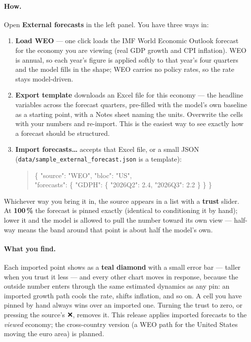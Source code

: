 \documentclass[11pt]{article}
\theoremstyle{definition}
\theoremstyle{remark}
\begin{document}
\paragraph{How.} Open \textbf{External forecasts} in the left panel. You have three ways in:
\begin{enumerate}
  \item \textbf{Load WEO} --- one click loads the IMF World Economic Outlook forecast for the
    economy you are viewing (real GDP growth and CPI inflation). WEO is annual, so each year's
    figure is applied softly to that year's four quarters and the model fills in the shape;
    WEO carries no policy rates, so the rate stays model-driven.
  \item \textbf{Export template} downloads an Excel file for this economy --- the headline
    variables across the forecast quarters, pre-filled with the model's own baseline as a
    starting point, with a Notes sheet naming the units. Overwrite the cells with your numbers
    and re-import. This is the easiest way to see exactly how a forecast should be structured.
  \item \textbf{Import forecasts\ldots} accepts that Excel file, or a small JSON
    (\texttt{data/sample\_external\_forecast.json} is a template):
\begin{quote}\small\ttfamily
\{ "source": "WEO", "bloc": "US",\\
\phantom{xx}"forecasts": \{ "GDPH": \{ "2026Q2": 2.4, "2026Q3": 2.2 \} \} \}
\end{quote}
\end{enumerate}
Whichever way you bring it in, the source appears in a list with a \textbf{trust} slider. At
\textbf{100\,\%} the forecast is pinned exactly (identical to conditioning it by hand); lower
it and the model is allowed to pull the number toward its own view --- half-way means the band
around that point is about half the model's own.

\paragraph{What you find.} Each imported point shows as a \textbf{teal diamond} with a small
error bar --- taller when you trust it less --- and every other chart moves in response,
because the outside number enters through the same estimated dynamics as any pin: an
imported growth path cools the rate, shifts inflation, and so on. A cell you have pinned by
hand always wins over an imported one. Turning the trust to zero, or pressing the source's
\textbf{✕}, removes it. This release applies imported forecasts to the \emph{viewed} economy;
the cross-country version (a WEO path for the United States moving the euro area) is planned.
\end{document}
